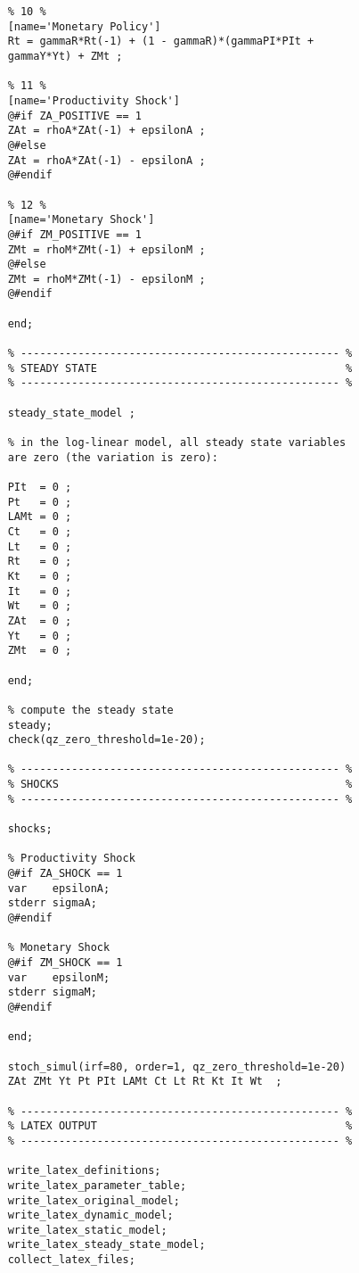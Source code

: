 \documentclass[
thesis.tex
]{subfiles}
\begin{document}
{\begin{verbatim}
	% 10 %
	[name='Monetary Policy']
	Rt = gammaR*Rt(-1) + (1 - gammaR)*(gammaPI*PIt + 
	gammaY*Yt) + ZMt ;
	
	% 11 %
	[name='Productivity Shock']
	@#if ZA_POSITIVE == 1
	ZAt = rhoA*ZAt(-1) + epsilonA ;
	@#else
	ZAt = rhoA*ZAt(-1) - epsilonA ;
	@#endif
	
	% 12 %
	[name='Monetary Shock']
	@#if ZM_POSITIVE == 1
	ZMt = rhoM*ZMt(-1) + epsilonM ;
	@#else
	ZMt = rhoM*ZMt(-1) - epsilonM ;
	@#endif
	
	end;
	
	% -------------------------------------------------- % 
	% STEADY STATE                                       %
	% -------------------------------------------------- % 
	
	steady_state_model ;
	
	% in the log-linear model, all steady state variables
	are zero (the variation is zero):
	
	PIt  = 0 ;
	Pt   = 0 ;
	LAMt = 0 ;
	Ct   = 0 ;
	Lt   = 0 ;
	Rt   = 0 ;
	Kt   = 0 ;
	It   = 0 ;
	Wt   = 0 ;
	ZAt  = 0 ;
	Yt   = 0 ;
	ZMt  = 0 ;
	
	end;
	
	% compute the steady state
	steady;
	check(qz_zero_threshold=1e-20);
	
	% -------------------------------------------------- % 
	% SHOCKS                                             %
	% -------------------------------------------------- % 
	
	shocks; 
	
	% Productivity Shock
	@#if ZA_SHOCK == 1
	var    epsilonA;
	stderr sigmaA;
	@#endif
	
	% Monetary Shock
	@#if ZM_SHOCK == 1
	var    epsilonM;
	stderr sigmaM;
	@#endif
	
	end;
	
	stoch_simul(irf=80, order=1, qz_zero_threshold=1e-20) 
	ZAt ZMt Yt Pt PIt LAMt Ct Lt Rt Kt It Wt  ;
	
	% -------------------------------------------------- % 
	% LATEX OUTPUT                                       %
	% -------------------------------------------------- % 
	
	write_latex_definitions;
	write_latex_parameter_table;
	write_latex_original_model;
	write_latex_dynamic_model;
	write_latex_static_model;
	write_latex_steady_state_model;
	collect_latex_files;
	
\end{verbatim}

} %
\end{document}
